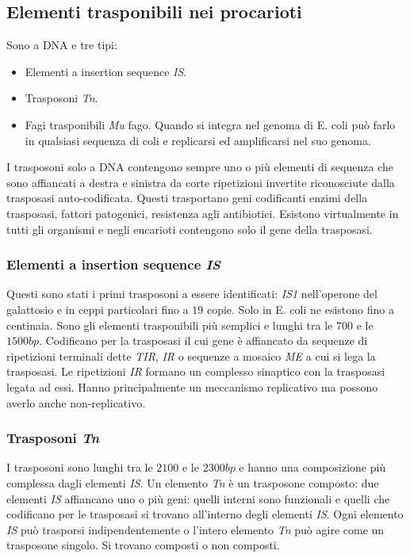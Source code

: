 	\subsection{Elementi trasponibili nei procarioti}
	Sono a DNA e tre tipi:
	\begin{itemize}
		\item Elementi a insertion sequence \emph{IS}.
		\item Trasposoni \emph{Tn}.
		\item Fagi trasponibili \emph{Mu} fago.
			Quando si integra nel genoma di E. coli pu\`o farlo in qualsiasi sequenza di coli e replicarsi ed amplificarsi nel suo genoma.
	\end{itemize}
	I trasposoni solo a DNA contengono sempre uno o pi\`u elementi di sequenza che sono affiancati a destra e sinistra da corte ripetizioni invertite riconosciute dalla trasposasi auto-codificata.
	Questi trasportano geni codificanti enzimi della trasposasi, fattori patogenici, resistenza agli antibiotici.
	Esistono virtualmente in tutti gli organismi e negli eucarioti contengono solo il gene della trasposasi.

		\subsubsection{Elementi a insertion sequence \emph{IS}}
		Questi sono stati i primi trasposoni a essere identificati: \emph{IS1} nell'operone del galattosio e in ceppi particolari fino a $19$ copie.
		Solo in E. coli ne esistono fino a centinaia.
		Sono gli elementi trasponibili pi\`u semplici e lunghi tra le $700$ e le $1500bp$.
		Codificano per la trasposasi il cui gene \`e affiancato da sequenze di ripetizioni terminali dette \emph{TIR}, \emph{IR} o sequenze a mosaico \emph{ME} a cui si lega la trasposasi.
		Le ripetizioni \emph{IR} formano un complesso sinaptico con la trasposasi legata ad essi. 
		Hanno principalmente un meccanismo replicativo ma possono averlo anche non-replicativo.

		\subsubsection{Trasposoni \emph{Tn}}
		I trasposoni sono lunghi tra le $2100$ e le $2300bp$ e hanno una composizione pi\`u complessa dagli elementi \emph{IS}.
		Un elemento \emph{Tn} \`e un trasposone composto: due elementi \emph{IS} affiancano uno o pi\`u geni: quelli interni sono funzionali e quelli che codificano per le trasposasi si trovano all'interno degli elementi \emph{IS}.
		Ogni elemento \emph{IS} pu\`o trasporsi indipendentemente o l'intero elemento \emph{Tn} pu\`o agire come un trasposone singolo.
		Si trovano composti o non composti.

